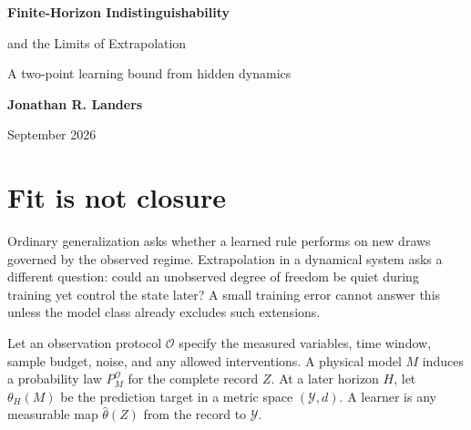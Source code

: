 \documentclass[10pt]{article}
\begin{document}
\begin{center}
{\LARGE\bfseries\color{DeepBlue}Finite-Horizon Indistinguishability\par
\vspace{1pt}
and the Limits of Extrapolation\par}
\vspace{4pt}
{\normalsize A two-point learning bound from hidden dynamics}\par
\vspace{6pt}
{\normalsize\textbf{Jonathan R. Landers}}\par
{\small September 2026}
\end{center}

\begin{abstract}
\noindent A learner may fit every observation in a finite experiment while remaining unable to predict a consequential latent mode outside that experiment. We formalize this as a two-point minimax bound: if two dynamical models induce training-record laws within total variation $\varepsilon$ but their future targets are separated by $\Delta$, every learner has probability at least $(1-\varepsilon)/2$ of making error at least $\Delta/2$ on one of them. A pair of weakly coupled harmonic oscillators then gives an explicit stable, bounded-energy witness. For passive noisy observation, reliable prediction of a full-amplitude consequence at time $T_*$ requires a sample count of order $(T_*/T)^4$, where $T$ is the training horizon. The statistical device is classical; the point is its interpretation as a finite-horizon limit on learning under physically incomplete model classes.
\end{abstract}

\section{Fit is not closure}

Ordinary generalization asks whether a learned rule performs on new draws governed by the observed regime. Extrapolation in a dynamical system asks a different question: could an unobserved degree of freedom be quiet during training yet control the state later? A small training error cannot answer this unless the model class already excludes such extensions.

Let an observation protocol $\mathcal O$ specify the measured variables, time window, sample budget, noise, and any allowed interventions. A physical model $M$ induces a probability law $P_M^{\mathcal O}$ for the complete record $Z$. At a later horizon $H$, let $\theta_H(M)$ be the prediction target in a metric space $(\mathcal Y,d)$. A learner is any measurable map $\widehat\theta(Z)$ from the record to $\mathcal Y$.
\end{document}
